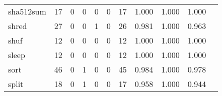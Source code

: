 \begin{longtable}{lp{1.2cm}p{1.2cm}p{1.2cm}p{1.2cm}p{1.2cm}p{1.2cm}p{1.2cm}p{1.2cm}p{1.2cm}p{1.2cm}}
sha512sum &                                    17 &                                                  0 &                                                  0 &                                                  0 &                                                  0 &                                                 17 &                                         1.000 &                                              1.000 &                                              1.000 \\
shred     &                                    27 &                                                  0 &                                                  0 &                                                  1 &                                                  0 &                                                 26 &                                         0.981 &                                              1.000 &                                              0.963 \\
shuf      &                                    12 &                                                  0 &                                                  0 &                                                  0 &                                                  0 &                                                 12 &                                         1.000 &                                              1.000 &                                              1.000 \\
sleep     &                                    12 &                                                  0 &                                                  0 &                                                  0 &                                                  0 &                                                 12 &                                         1.000 &                                              1.000 &                                              1.000 \\
sort      &                                    46 &                                                  0 &                                                  1 &                                                  0 &                                                  0 &                                                 45 &                                         0.984 &                                              1.000 &                                              0.978 \\
split     &                                    18 &                                                  0 &                                                  1 &                                                  0 &                                                  0 &                                                 17 &                                         0.958 &                                              1.000 &                                              0.944 \\

\end{longtable}
